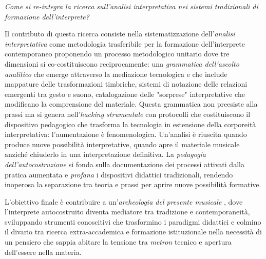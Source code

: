 \documentclass[11pt]{article}
\begin{document}
\emph{Come si re-integra la ricerca sull'\textit{analisi interpretativa} nei sistemi tradizionali di formazione dell'interprete?}

Il contributo di questa ricerca consiste nella sistematizzazione dell'\textit{analisi interpretativa} come metodologia trasferibile per la formazione dell'interprete contemporaneo %
proponendo un processo metodologico unitario dove tre dimensioni si co-costituiscono reciprocamente: una \emph{grammatica dell'ascolto analitico} che emerge attraverso la mediazione tecnologica %
e che include mappature delle trasformazioni timbriche, sistemi di notazione delle relazioni emergenti tra gesto e suono, catalogazione delle "sorprese" interpretative che modificano la comprensione del materiale. Questa grammatica non preesiste alla prassi ma si genera nell'\emph{hacking strumentale} con protocolli che costituiscono il dispositivo pedagogico che trasforma la tecnologia in estensione della corporeità interpretativa: l'aumentazione è fenomenologica. %
Un'analisi è riuscita quando produce nuove possibilità interpretative, quando apre il materiale musicale anziché chiuderlo in una interpretazione definitiva. La \emph{pedagogia dell'autocostruzione} si fonda sulla documentazione dei processi attivati dalla pratica aumentata \citep{freire1970pedagogia} %
e \emph{profana} i dispositivi didattici tradizionali, rendendo inoperosa la separazione tra teoria e prassi per aprire nuove possibilità formative.

L'obiettivo finale è contribuire a un'\emph{archeologia del presente musicale} \citep{agamben2008apparatus}, dove l'interprete autocostruito diventa mediatore tra tradizione e contemporaneità, sviluppando strumenti conoscitivi che trasformino i paradigmi didattici e colmino il divario tra ricerca extra-accademica e formazione istituzionale nella necessità di un pensiero che sappia abitare la tensione tra \textit{metron} tecnico e apertura dell'essere nella materia.



\end{document}
